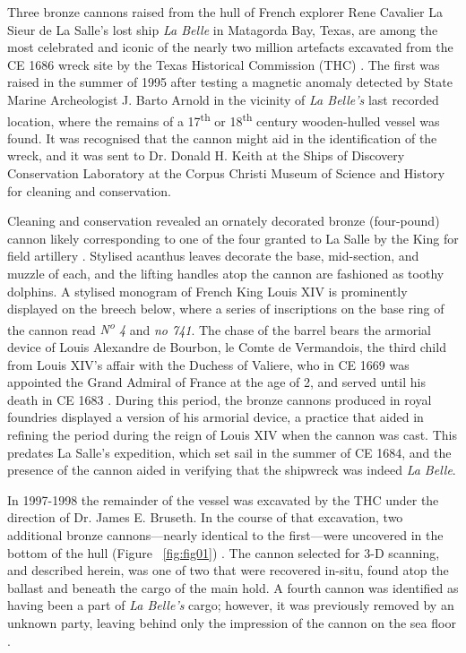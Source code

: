 \documentclass[review]{elsarticle}
\begin{document}
Three bronze cannons raised from the hull of French explorer Rene Cavalier La Sieur de La Salle's lost ship \textit{La Belle} in Matagorda Bay, Texas, are among the most celebrated and iconic of the nearly two million artefacts excavated from the CE 1686 wreck site by the Texas Historical Commission (THC) \citep{RN5767}. The first was raised in the summer of 1995 after testing a magnetic anomaly detected by State Marine Archeologist J. Barto Arnold in the vicinity of\textit{ La Belle's} last recorded location, where the remains of a 17\textsuperscript{th} or 18\textsuperscript{th} century wooden-hulled vessel \citep{RN5766,RN5765} was found. It was recognised that the cannon might aid in the identification of the wreck, and it was sent to Dr. Donald H. Keith at the Ships of Discovery Conservation Laboratory at the Corpus Christi Museum of Science and History for cleaning and conservation.

Cleaning and conservation revealed an ornately decorated bronze (four-pound) cannon likely corresponding to one of the four granted to La Salle by the King for field artillery \citep{RN5763,RN5764}. Stylised acanthus leaves decorate the base, mid-section, and muzzle of each, and the lifting handles atop the cannon are fashioned as toothy dolphins. A stylised monogram of French King Louis XIV is prominently displayed on the breech below, where a series of inscriptions on the base ring of the cannon read \textit{N\textsuperscript{o} 4} and \textit{no  741}. The chase of the barrel bears the armorial device of Louis Alexandre de Bourbon, le Comte de Vermandois, the third child from Louis XIV's affair with the Duchess of Valiere, who in CE 1669 was appointed the Grand Admiral of France at the age of 2, and served until his death in CE 1683 \citep[354]{RN5763}. During this period, the bronze cannons produced in royal foundries displayed a version of his armorial device, a practice that aided in refining the period during the reign of Louis XIV when the cannon was cast. This predates La Salle's expedition, which set sail in the summer of CE 1684, and the presence of the cannon aided in verifying that the shipwreck was indeed \textit{La Belle}.

In 1997-1998 the remainder of the vessel was excavated by the THC under the direction of Dr. James E. Bruseth. In the course of that excavation, two additional bronze cannons---nearly identical to the first---were uncovered in the bottom of the hull (Figure ~\ref{fig:fig01}) \citep{RN5763,RN5762,RN5761}. The cannon selected for 3-D scanning, and described herein, was one of two that were recovered in-situ, found atop the ballast and beneath the cargo of the main hold. A fourth cannon was identified as having been a part of \textit{La Belle's} cargo; however, it was previously removed by an unknown party, leaving behind only the impression of the cannon on the sea floor \citep{RN5763}.
\end{document}
